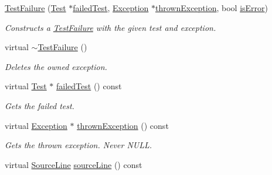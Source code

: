 \begin{DoxyCompactItemize}
\item 
\hypertarget{class_test_failure_a0c1b4cee94278814ab7a4ba72f94dac3}{\hyperlink{class_test_failure_a0c1b4cee94278814ab7a4ba72f94dac3}{Test\+Failure} (\hyperlink{class_test}{Test} $\ast$\hyperlink{class_test_failure_a8c7da6077f68897785a69cea6c2b7825}{failed\+Test}, \hyperlink{class_exception}{Exception} $\ast$\hyperlink{class_test_failure_ac12b8f4d9a6a1f130834cf08287d869d}{thrown\+Exception}, bool \hyperlink{class_test_failure_a0b6c1ee50d2186a4918f015d7879e8dd}{is\+Error})}\label{class_test_failure_a0c1b4cee94278814ab7a4ba72f94dac3}

\begin{DoxyCompactList}\small\item\em Constructs a \hyperlink{class_test_failure}{Test\+Failure} with the given test and exception. \end{DoxyCompactList}\item 
\hypertarget{class_test_failure_a117d2f3616bed325e97b0ac2fe7d9e4b}{virtual \hyperlink{class_test_failure_a117d2f3616bed325e97b0ac2fe7d9e4b}{$\sim$\+Test\+Failure} ()}\label{class_test_failure_a117d2f3616bed325e97b0ac2fe7d9e4b}

\begin{DoxyCompactList}\small\item\em Deletes the owned exception. \end{DoxyCompactList}\item 
\hypertarget{class_test_failure_a8c7da6077f68897785a69cea6c2b7825}{virtual \hyperlink{class_test}{Test} $\ast$ \hyperlink{class_test_failure_a8c7da6077f68897785a69cea6c2b7825}{failed\+Test} () const }\label{class_test_failure_a8c7da6077f68897785a69cea6c2b7825}

\begin{DoxyCompactList}\small\item\em Gets the failed test. \end{DoxyCompactList}\item 
\hypertarget{class_test_failure_ac12b8f4d9a6a1f130834cf08287d869d}{virtual \hyperlink{class_exception}{Exception} $\ast$ \hyperlink{class_test_failure_ac12b8f4d9a6a1f130834cf08287d869d}{thrown\+Exception} () const }\label{class_test_failure_ac12b8f4d9a6a1f130834cf08287d869d}

\begin{DoxyCompactList}\small\item\em Gets the thrown exception. Never {\ttfamily N\+U\+L\+L}. \end{DoxyCompactList}\item 
\hypertarget{class_test_failure_a0da7fc89d01c8b42c96cd0542eba58eb}{virtual \hyperlink{class_source_line}{Source\+Line} \hyperlink{class_test_failure_a0da7fc89d01c8b42c96cd0542eba58eb}{source\+Line} () const }\label{class_test_failure_a0da7fc89d01c8b42c96cd0542eba58eb}


\end{DoxyCompactItemize}
